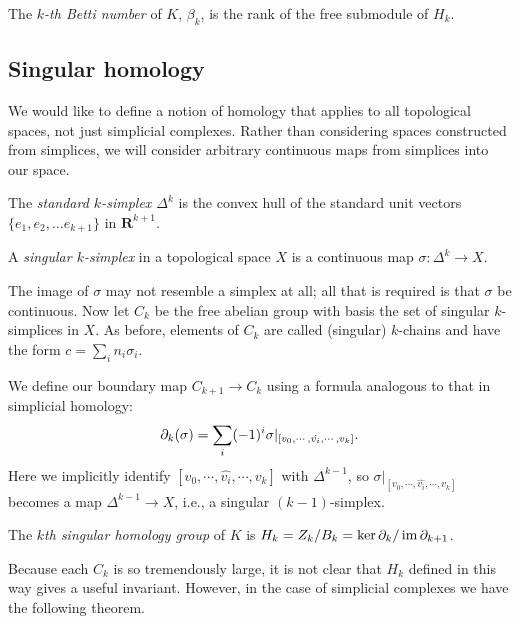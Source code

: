 \begin{definition}
The \emph{$k$-th Betti number} of $K$, $\beta_k$, is the rank of the free submodule of $H_k$.
\end{definition}

\subsection{Singular homology}

We would like to define a notion of homology that applies to all topological spaces, not just simplicial complexes. Rather than considering spaces constructed from simplices, we will consider arbitrary continuous maps from simplices into our space.

\begin{definition}
The \emph{standard $k$-simplex $\Delta^k$} is the convex hull of the standard unit vectors $\{e_1, e_2, \dots e_{k+1}\}$ in $\mathbf{R}^{k+1}$.
\end{definition}

\begin{definition}
A \emph{singular $k$-simplex} in a topological space $X$ is a continuous map $\sigma : \Delta^k \to X$.
\end{definition}

The image of $\sigma$ may not resemble a simplex at all; all that is required is that $\sigma$ be continuous. Now let $C_k$ be the free abelian group with basis the set of singular $k$-simplices in $X$. As before, elements of $C_k$ are called (singular) $k$-chains and have the form $c = \sum_i n_i \sigma_i$.

We define our boundary map $C_{k+1} \to C_k$ using a formula analogous to that in simplicial homology:
\begin{align*}
\partial_k(\sigma) = \sum_i (-1)^i \sigma |_{[v_0, \cdots, \hat{v_i}, \cdots, v_k]}.
\end{align*}
Here we implicitly identify $[v_0, \cdots, \hat{v_i}, \cdots, v_k]$ with $\Delta^{k-1}$, so $\sigma |_{[v_0, \cdots, \hat{v_i}, \cdots, v_k]}$ becomes a map $\Delta^{k-1} \to X$, i.e., a singular $(k-1)$-simplex.

\begin{definition}
The \emph{$k$th singular homology group} of $K$ is $H_k = Z_k / B_k = \ker \partial_k / \operatorname{im} \partial_{k+1}$.
\end{definition}

Because each $C_k$ is so tremendously large, it is not clear that $H_k$ defined in this way gives a useful invariant. However, in the case of simplicial complexes we have the following theorem.

